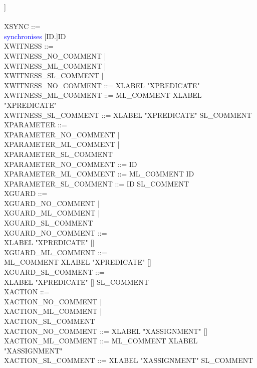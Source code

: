 \begin{center}
\begin{Bcode}
    \Btab \Btab ]\\
    \Btab \Btab \Bend\\
    XSYNC ::= \\
    \Btab \Btab \textcolor{blue}{synchronises} [ID.]ID\\
    XWITNESS ::= \\
    \Btab \Btab XWITNESS\_NO\_COMMENT | \\
    \Btab \Btab XWITNESS\_ML\_COMMENT | \\
    \Btab \Btab XWITNESS\_SL\_COMMENT | \\
    XWITNESS\_NO\_COMMENT ::= XLABEL "XPREDICATE" \\
    XWITNESS\_ML\_COMMENT ::= ML\_COMMENT XLABEL "XPREDICATE" \\
    XWITNESS\_SL\_COMMENT ::= XLABEL "XPREDICATE" SL\_COMMENT \\
    XPARAMETER ::= \\
    \Btab \Btab XPARAMETER\_NO\_COMMENT | \\
    \Btab \Btab XPARAMETER\_ML\_COMMENT | \\
    \Btab \Btab XPARAMETER\_SL\_COMMENT \\
    XPARAMETER\_NO\_COMMENT ::= ID \\
    XPARAMETER\_ML\_COMMENT ::= ML\_COMMENT ID \\
    XPARAMETER\_SL\_COMMENT ::= ID SL\_COMMENT \\
    XGUARD ::=\\
    \Btab \Btab XGUARD\_NO\_COMMENT |\\
    \Btab \Btab XGUARD\_ML\_COMMENT |\\
    \Btab \Btab XGUARD\_SL\_COMMENT\\
    XGUARD\_NO\_COMMENT ::= \\
    \Btab \Btab XLABEL "XPREDICATE" [\Btheorem]\\
    XGUARD\_ML\_COMMENT ::= \\
    \Btab \Btab ML\_COMMENT XLABEL "XPREDICATE" [\Btheorem]\\
    XGUARD\_SL\_COMMENT ::= \\
    \Btab \Btab XLABEL "XPREDICATE" [\Btheorem] SL\_COMMENT\\
    XACTION ::=\\
    \Btab \Btab XACTION\_NO\_COMMENT |\\
    \Btab \Btab XACTION\_ML\_COMMENT |\\
    \Btab \Btab XACTION\_SL\_COMMENT\\
    XACTION\_NO\_COMMENT ::= XLABEL "XASSIGNMENT" [\Btheorem]\\
    XACTION\_ML\_COMMENT ::= ML\_COMMENT XLABEL "XASSIGNMENT"\\
    XACTION\_SL\_COMMENT ::= XLABEL "XASSIGNMENT" SL\_COMMENT
  \end{Bcode}
\end{center}

